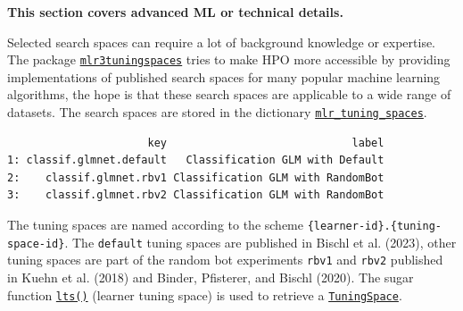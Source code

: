 \begin{tcolorbox}[enhanced jigsaw, colframe=quarto-callout-note-color-frame, rightrule=.15mm, bottomrule=.15mm, toprule=.15mm, opacityback=0, colback=white, left=2mm, arc=.35mm, breakable, leftrule=.75mm]
\begin{minipage}[t]{5.5mm}
\textcolor{quarto-callout-note-color}{\faInfo}
\end{minipage}%
\begin{minipage}[t]{\textwidth - 5.5mm}

\textbf{This section covers advanced ML or technical
details.}\vspace{2mm}

\end{minipage}%
\end{tcolorbox}

Selected search spaces can require a lot of background knowledge or
expertise. The package
\href{https://mlr3tuningspaces.mlr-org.com}{\texttt{mlr3tuningspaces}}
tries to make HPO more accessible by providing implementations of
published search spaces for many popular machine learning algorithms,
the hope is that these search spaces are applicable to a wide range of
datasets. The search spaces are stored in the dictionary
\href{https://mlr3tuningspaces.mlr-org.com/reference/mlr_tuning_spaces.html}{\texttt{mlr\_tuning\_spaces}}.

\begin{Shaded}
\begin{Highlighting}[]
\NormalTok{(mlr\_tuning\_spaces)[}\SpecialCharTok{:}\NormalTok{, .(key, label)]}
\end{Highlighting}
\end{Shaded}

\begin{verbatim}
                      key                             label
1: classif.glmnet.default   Classification GLM with Default
2:    classif.glmnet.rbv1 Classification GLM with RandomBot
3:    classif.glmnet.rbv2 Classification GLM with RandomBot
\end{verbatim}

The tuning spaces are named according to the scheme
\texttt{\{learner-id\}.\{tuning-space-id\}}. The \texttt{default} tuning
spaces are published in Bischl et al. (2023), other tuning spaces are
part of the random bot experiments \texttt{rbv1} and \texttt{rbv2}
published in Kuehn et al. (2018) and Binder, Pfisterer, and Bischl
(2020). The sugar function
\href{https://mlr3tuningspaces.mlr-org.com/reference/lts.html}{\texttt{lts()}}
(learner tuning space) is used to retrieve a
\href{https://mlr3tuningspaces.mlr-org.com/reference/TuningSpace.html}{\texttt{TuningSpace}}.

